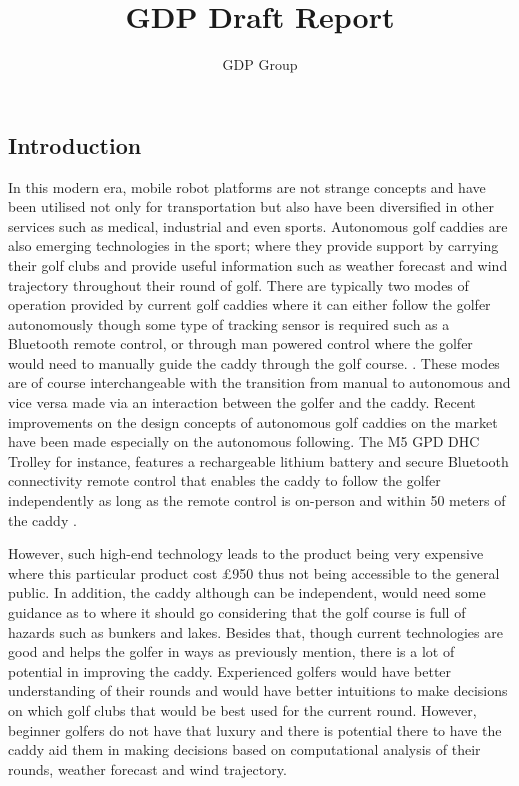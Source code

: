 \documentclass[11pt,landscape]{article}
\title{GDP Draft Report}
\author{GDP Group}
\begin{document}
\maketitle
\newpage
\begin{multicols}{3}
\tableofcontents

\section{Introduction}
In this modern era, mobile robot platforms are not strange concepts and have
been utilised not only for transportation but also have been diversified in
other services such as medical, industrial and even sports. Autonomous golf
caddies are also emerging technologies in the sport; where they provide support
by carrying their golf clubs and provide useful information such as weather
forecast and wind trajectory throughout their round of golf. There are typically
two modes of operation provided by current golf caddies where it can either
follow the golfer autonomously though some type of tracking sensor is required
such as a Bluetooth remote control, or through man powered control where the
golfer would need to manually guide the caddy through the golf course.
\cite{choi_2020}. These modes are of course interchangeable with the transition
from manual to autonomous and vice versa made via an interaction between the
golfer and the caddy. Recent improvements on the design concepts of autonomous
golf caddies on the market have been made especially on the autonomous
following. The M5 GPD DHC Trolley for instance, features a rechargeable lithium
battery and secure Bluetooth connectivity remote control that enables the caddy
to follow the golfer independently as long as the remote control is on-person
and within 50 meters of the caddy \cite{golf_2022}.

However, such high-end technology leads to the product being very expensive
where this particular product cost £950 thus not being accessible to the general
public. In addition, the caddy although can be independent, would need some
guidance as to where it should go considering that the golf course is full of
hazards such as bunkers and lakes. Besides that, though current technologies are
good and helps the golfer in ways as previously mention, there is a lot of
potential in improving the caddy. Experienced golfers would have better
understanding of their rounds and would have better intuitions to make decisions
on which golf clubs that would be best used for the current round. However,
beginner golfers do not have that luxury and there is potential there to have
the caddy aid them in making decisions based on computational analysis of their
rounds, weather forecast and wind trajectory. 


\end{multicols}
\end{document}
